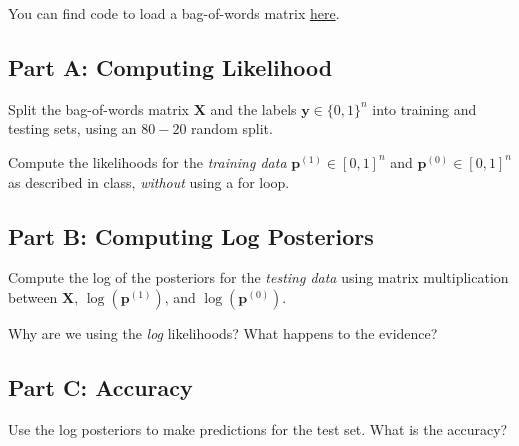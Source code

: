 \documentclass{article}
\begin{document}
You can find code to load a bag-of-words matrix \href{https://www.rtealwitter.com/datamining2025/psets/starter_code/spam_bag_of_words.py}{here}.

\subsection*{Part A: Computing Likelihood}

Split the bag-of-words matrix $\mathbf{X}$ and the labels $\mathbf{y} \in \{0,1\}^n$ into training and testing sets, using an $80-20$ random split.

Compute the likelihoods for the \textit{training data} $\mathbf{p}^{(1)} \in [0,1]^n$ and $\mathbf{p}^{(0)} \in [0,1]^n$ as described in class, \textit{without} using a for loop.

\subsection*{Part B: Computing Log Posteriors}

Compute the log of the posteriors for the \textit{testing data} using matrix multiplication between $\mathbf{X}$, $\log(\mathbf{p}^{(1)})$, and $\log(\mathbf{p}^{(0)})$.

Why are we using the \textit{log} likelihoods? What happens to the evidence?

\subsection*{Part C: Accuracy}

Use the log posteriors to make predictions for the test set. What is the accuracy?

%
\end{document}
